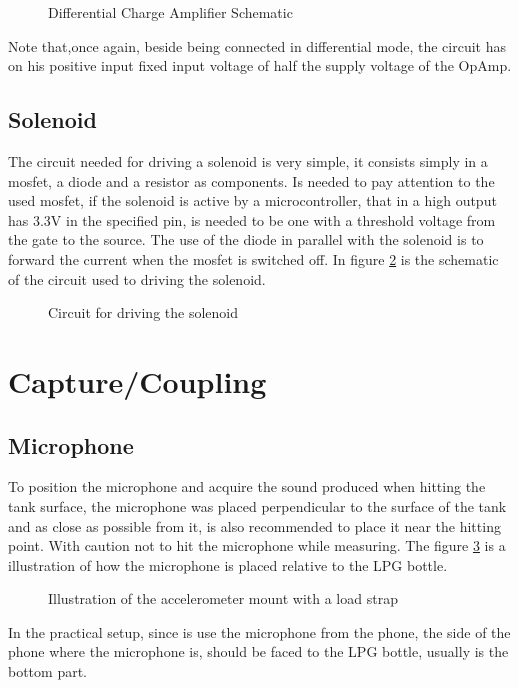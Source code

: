 \begin{figure}[!htb]
    \centering
    \caption{Differential Charge Amplifier Schematic}
    \label{fig:ChargeAmpDifSCH}
\end{figure}
Note that,once again, beside being connected in differential mode, the circuit has on his positive input fixed input voltage of half the supply voltage of the OpAmp.
\subsection{Solenoid}
The circuit needed for driving a solenoid is very simple, it consists simply in a mosfet, a diode and a resistor as components. Is needed to pay attention to the used mosfet, if the solenoid is active by a microcontroller, that in a high output has 3.3V in the specified pin, is needed to be one with a threshold voltage from the gate to the source. The use of the diode in parallel with the solenoid is to forward the current when the mosfet is switched off. In figure \ref{fig:solenoidshc} is the schematic of the circuit used to driving the solenoid.
\begin{figure}[!htb]
    \centering
    \caption{Circuit for driving the solenoid}
    \label{fig:solenoidshc}
\end{figure}
\section{Capture/Coupling}
\subsection{Microphone}
To position the microphone and acquire the sound produced when hitting the tank surface, the microphone was placed perpendicular to the surface of the tank and as close as possible from it, is also recommended to place it near the hitting point. With caution not to hit the microphone while measuring. The figure \ref{fig:micmount} is a illustration of how the microphone is placed relative to the LPG bottle.
\begin{figure}[!htb]
    \centering
    \caption{Illustration of the accelerometer mount with a load strap}
    \label{fig:micmount}
\end{figure}
In the practical setup, since is use the microphone from the phone, the side of the phone where the microphone is, should be faced to the LPG bottle, usually is the bottom part.
